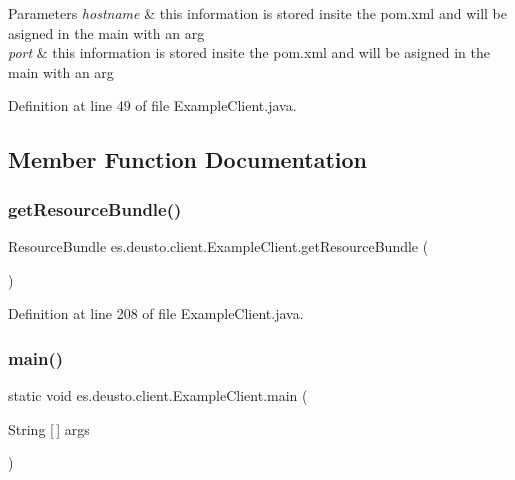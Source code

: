\begin{DoxyParams}{Parameters}
{\em hostname} & this information is stored insite the pom.\+xml and will be asigned in the main with an arg \\
\hline
{\em port} & this information is stored insite the pom.\+xml and will be asigned in the main with an arg \\
\hline
\end{DoxyParams}


Definition at line 49 of file Example\+Client.\+java.



\subsection{Member Function Documentation}
\mbox{\label{classes_1_1deusto_1_1client_1_1_example_client_a85a29c19dfbfcad9d08dcc17d688d8d3}} 
\subsubsection{\texorpdfstring{get\+Resource\+Bundle()}{getResourceBundle()}}
{\footnotesize\ttfamily Resource\+Bundle es.\+deusto.\+client.\+Example\+Client.\+get\+Resource\+Bundle (\begin{DoxyParamCaption}{ }\end{DoxyParamCaption})}



Definition at line 208 of file Example\+Client.\+java.

\mbox{\label{classes_1_1deusto_1_1client_1_1_example_client_a9eadbc017db92b83cad1f6b72c10bae2}} 
\subsubsection{\texorpdfstring{main()}{main()}}
{\footnotesize\ttfamily static void es.\+deusto.\+client.\+Example\+Client.\+main (\begin{DoxyParamCaption}\item[{String \mbox{[}$\,$\mbox{]}}]{args }\end{DoxyParamCaption})\hspace{0.3cm}{\ttfamily [static]}}



